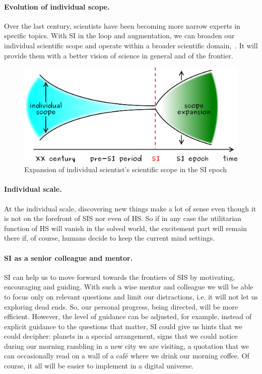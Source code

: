 \documentclass[a4paper,11pt]{article}
\begin{document}
\paragraph{Evolution of individual scope.} 
Over the last century, scientists have been becoming more narrow experts in specific topics. With SI in the loop and augmentation, we can broaden our individual scientific scope and operate within a broader scientific domain,~. It will provide them with a better vision of science in general and of the frontier.

\begin{figure}
    \includegraphics[width=1\textwidth]{scope}
    \caption{\label{fig:scope}Expansion of individual scientist's scientific scope in the SI epoch}
\end{figure}

\paragraph{Individual scale.}

At the individual scale, discovering new things make a lot of sense even though it is not on the forefront of SIS nor even of HS. So if in any case the utilitarian function of HS will vanish in the solved world, the excitement part will remain there if, of course, humans decide to keep the current mind settings.

\paragraph{SI as a senior colleague and mentor.}

SI can help us to move forward towards the frontiers of SIS by motivating, encouraging and guiding. With such a wise mentor and colleague we will be able to focus only on relevant questions and limit our distractions, i.e. it will not let us exploring dead ends. So, our personal progress, being directed, will be more efficient. However, the level of guidance can be adjusted, for example, instead of explicit guidance to the questions that matter, SI could give us hints that we could decipher: planets in a special arrangement, signs that we could notice during our morning rambling in a new city we are visiting, a quotation that we can occasionally read on a wall of a café where we drink our morning coffee. Of course, it all will be easier to implement in a digital universe.
\end{document}
